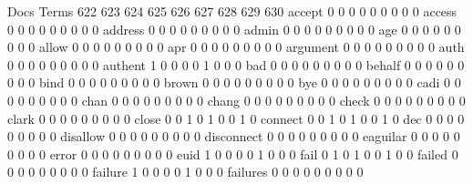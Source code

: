 \documentclass[compress,8pt]{beamer}
\begin{document}
\begin{frame}
\begin{Schunk}
                                          Docs
Terms                                      622 623 624 625 626 627 628 629 630
  accept                                     0   0   0   0   0   0   0   0   0
  access                                     0   0   0   0   0   0   0   0   0
  address                                    0   0   0   0   0   0   0   0   0
  admin                                      0   0   0   0   0   0   0   0   0
  age                                        0   0   0   0   0   0   0   0   0
  allow                                      0   0   0   0   0   0   0   0   0
  apr                                        0   0   0   0   0   0   0   0   0
  argument                                   0   0   0   0   0   0   0   0   0
  auth                                       0   0   0   0   0   0   0   0   0
  authent                                    1   0   0   0   0   1   0   0   0
  bad                                        0   0   0   0   0   0   0   0   0
  behalf                                     0   0   0   0   0   0   0   0   0
  bind                                       0   0   0   0   0   0   0   0   0
  brown                                      0   0   0   0   0   0   0   0   0
  bye                                        0   0   0   0   0   0   0   0   0
  cadi                                       0   0   0   0   0   0   0   0   0
  chan                                       0   0   0   0   0   0   0   0   0
  chang                                      0   0   0   0   0   0   0   0   0
  check                                      0   0   0   0   0   0   0   0   0
  clark                                      0   0   0   0   0   0   0   0   0
  close                                      0   0   1   0   1   0   0   1   0
  connect                                    0   0   1   0   1   0   0   1   0
  dec                                        0   0   0   0   0   0   0   0   0
  disallow                                   0   0   0   0   0   0   0   0   0
  disconnect                                 0   0   0   0   0   0   0   0   0
  eaguilar                                   0   0   0   0   0   0   0   0   0
  error                                      0   0   0   0   0   0   0   0   0
  euid                                       1   0   0   0   0   1   0   0   0
  fail                                       0   1   0   1   0   0   1   0   0
  failed                                     0   0   0   0   0   0   0   0   0
  failure                                    1   0   0   0   0   1   0   0   0
  failures                                   0   0   0   0   0   0   0   0   0

\end{Schunk}
\end{frame}
\end{document}
